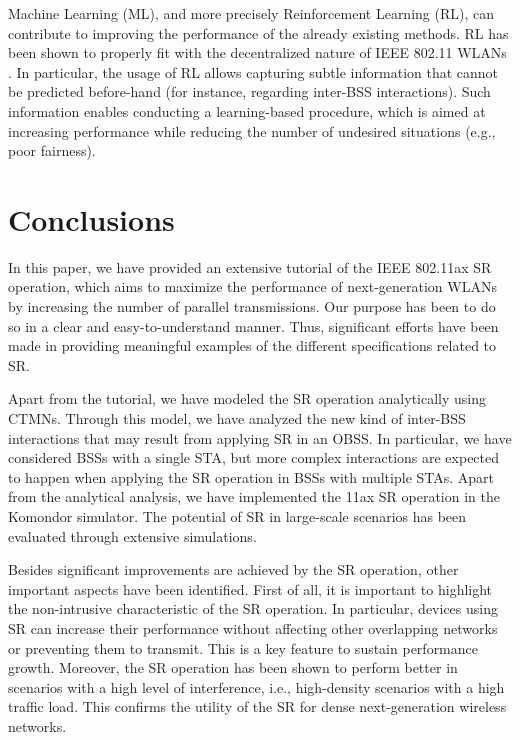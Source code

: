 \documentclass{article}
\begin{document}
Machine Learning (ML), and more precisely Reinforcement Learning (RL), can contribute to improving the performance of the already existing methods. RL has been shown to properly fit with the decentralized nature of IEEE 802.11 WLANs \cite{long2007non, naddafzadeh2010distributed, zhou2011reinforcement, ghadimi2017reinforcement, wilhelmi2019collaborative, wilhelmi2019potential}. In particular, the usage of RL allows capturing subtle information that cannot be predicted before-hand (for instance, regarding inter-BSS interactions). Such information enables conducting a learning-based procedure, which is aimed at increasing performance while reducing the number of undesired situations (e.g., poor fairness).

\section{Conclusions}
\label{section:conclusions}
In this paper, we have provided an extensive tutorial of the IEEE 802.11ax SR operation, which aims to maximize the performance of next-generation WLANs by increasing the number of parallel transmissions. Our purpose has been to do so in a clear and easy-to-understand manner. Thus, significant efforts have been made in providing meaningful examples of the different specifications related to SR. %

Apart from the tutorial, we have modeled the SR operation analytically using CTMNs. Through this model, we have analyzed the new kind of inter-BSS interactions that may result from applying SR in an OBSS. In particular, we have considered BSSs with a single STA, but more complex interactions are expected to happen when applying the SR operation in BSSs with multiple STAs. Apart from the analytical analysis, we have implemented the 11ax SR operation in the Komondor simulator. The potential of SR in large-scale scenarios has been evaluated through extensive simulations.

Besides significant improvements are achieved by the SR operation, other important aspects have been identified. First of all, it is important to highlight the non-intrusive characteristic of the SR operation. In particular, devices using SR can increase their performance without affecting other overlapping networks or preventing them to transmit. This is a key feature to sustain performance growth. Moreover, the SR operation has been shown to perform better in scenarios with a high level of interference, i.e., high-density scenarios with a high traffic load. This confirms the utility of the SR for dense next-generation wireless networks.
\end{document}
